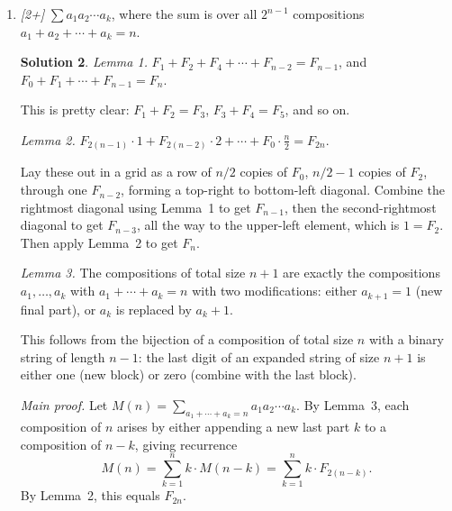 \documentclass[11pt]{article}
\theoremstyle{definition}
\newtheorem*{solution}{Solution}
\begin{document}
\begin{enumerate}[label=(\alph*)]
\begin{solution}
    If $n$ is even, the viable sequences start with 0 (then $f(n-1)$ subsequences on
    $n$ odd after that) or 11 (then $f(n-2)$ sequences on $n$ odd after that).

    If $n$ is odd, the viable sequences start with 1 (then $f(n-1)$ subsequences on
    $n$ odd after that) or 00 (then $f(n-2)$ sequences on $n$ odd after that).

    So $f(n) = f(n-1) + f(n-2)$. $f(n) = F_{n+2}$.
    \end{solution}

  \item \textit{[2+]} $\sum a_1 a_2 \cdots a_k$, where the sum is over all $2^{n-1}$
    compositions $a_1 + a_2 + \cdots + a_k = n$.
    \begin{solution}
    \textit{Lemma 1.} $F_1 + F_2 + F_4 + \cdots + F_{n-2} = F_{n-1}$, and
    $F_0 + F_1 + \cdots + F_{n-1} = F_n$.

    This is pretty clear: $F_1 + F_2 = F_3$, $F_3 + F_4 = F_5$, and so on.

    \textit{Lemma 2.} $F_{2(n-1)} \cdot 1 + F_{2(n-2)} \cdot 2 + \cdots + F_0 \cdot
    \frac{n}{2} = F_{2n}$.

    Lay these out in a grid as a row of $n/2$ copies of $F_0$, $n/2 - 1$ copies of
    $F_2$, through one $F_{n-2}$, forming a top-right to bottom-left diagonal. Combine
    the rightmost diagonal using Lemma~1 to get $F_{n-1}$, then the second-rightmost
    diagonal to get $F_{n-3}$, all the way to the upper-left element, which is
    $1 = F_2$. Then apply Lemma~2 to get $F_n$.

    \textit{Lemma 3.} The compositions of total size $n+1$ are exactly the
    compositions $a_1, \ldots, a_k$ with $a_1 + \cdots + a_k = n$ with two
    modifications: either $a_{k+1} = 1$ (new final part), or $a_k$ is replaced by
    $a_k + 1$.

    This follows from the bijection of a composition of total size $n$ with a binary
    string of length $n-1$: the last digit of an expanded string of size $n+1$ is
    either one (new block) or zero (combine with the last block).

    \textit{Main proof.} Let $M(n) = \sum_{a_1+\cdots+a_k=n} a_1 a_2 \cdots a_k$.
    By Lemma~3, each composition of $n$ arises by either appending a new last part $k$
    to a composition of $n-k$, giving recurrence
    \[
      M(n) = \sum_{k=1}^{n} k \cdot M(n-k)
           = \sum_{k=1}^{n} k \cdot F_{2(n-k)}.
    \]
    By Lemma~2, this equals $F_{2n}$.
    \end{solution}


\end{enumerate}
\end{document}
